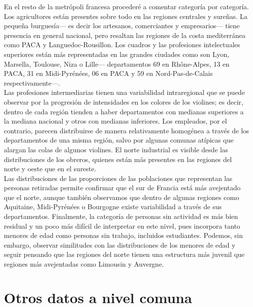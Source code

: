  En el resto de la metrópoli francesa procederé a comentar categoría por categoría. Los agricultores están presentes sobre todo en las regiones centrales y sureñas. La pequeña burguesía--- es decir los artesanos, comerciantes y empresarios--- tiene presencia en general nacional, pero resaltan las regiones de la costa mediterránea como PACA y Languedoc-Rousillon. Los cuadros y las profesiones intelectuales superiores están más representadas en las grandes ciudades como son Lyon, Marsella, Toulouse, Niza o Lille--- departamentos 69 en Rhône-Alpes, 13 en PACA, 31 en Midi-Pyrénées, 06 en PACA y 59 en Nord-Pas-de-Calais respectivamente---.\\ 
 
 Las profesiones intermediarias tienen una variabilidad intraregional que se puede observar por la progresión de intensidades en los colores de los violines; es decir, dentro de cada región tienden a haber departamentos con medianas superiores a la mediana nacional y otros con medianas inferiores. Los empleados, por el contrario, parecen distribuirse de manera relativamente homogénea a través de los departamentos de una misma región, salvo por algunas comunas atípicas que alargan las colas de algunos violines. El norte industrial es visible desde las distribuciones de los obreros, quienes están más presentes en las regiones del norte y oeste que en el sureste.\\
 
  Las distribuciones de las proporciones de las poblaciones que representan las personas retiradas permite confirmar que el sur de Francia está más avejentado que el norte, aunque también observamos que dentro de algunas regiones como Aquitaine, Midi-Pyrénées o Bourgogne existe variabilidad a través de sus departamentos. Finalmente, la categoría de personas sin actividad es más bien residual y un poco más difícil de interpretar en este nivel, pues incorpora tanto menores de edad como personas sin trabajo, incluidos estudiantes. Podemos, sin embargo, observar similitudes con las distribuciones de los menores de edad y seguir pensando que las regiones del norte tienen una estructura más juvenil que regiones más avejentadas como Limousin y Auvergne.\\

\clearpage
\section{Otros datos a nivel comuna}

